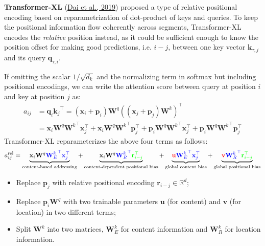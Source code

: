 \documentclass[12pt]{article}
\begin{document}
\textbf{Transformer-XL} (\href{https://arxiv.org/abs/1901.02860}{Dai et al., 2019}) proposed a type of relative positional encoding based on reparametrization of dot-product of keys and queries. To keep the positional information flow coherently across segments, Transformer-XL encodes the \emph{relative} position instead, as it could be sufficient enough to know the position offset for making good predictions, i.e. $i-j$, between one key vector $\mathbf{k}_{\tau, j}$ and its query $\mathbf{q}_{\tau, i}$.

If omitting the scalar $1/\sqrt{d_k}$ and the normalizing term in softmax but including positional encodings, we can write the attention score between query at position $i$ and key at position $j$ as:
\[
\begin{aligned}
a_{ij} 
&= \mathbf{q}_i {\mathbf{k}_j}^\top = (\mathbf{x}_i + \mathbf{p}_i)\mathbf{W}^q ((\mathbf{x}_j + \mathbf{p}_j)\mathbf{W}^k)^\top \\
&= \mathbf{x}_i\mathbf{W}^q {\mathbf{W}^k}^\top\mathbf{x}_j^\top + \mathbf{x}_i\mathbf{W}^q {\mathbf{W}^k}^\top\mathbf{p}_j^\top + \mathbf{p}_i\mathbf{W}^q {\mathbf{W}^k}^\top\mathbf{x}_j^\top + \mathbf{p}_i\mathbf{W}^q {\mathbf{W}^k}^\top\mathbf{p}_j^\top
\end{aligned}
\]
Transformer-XL reparameterizes the above four terms as follows:
\[
a_{ij}^\text{rel} = 
\underbrace{ \mathbf{x}_i\mathbf{W}^q \color{blue}{ {\mathbf{W}_E^k}^\top } \mathbf{x}_j^\top }_\text{content-based addressing} + 
\underbrace{ \mathbf{x}_i\mathbf{W}^q \color{blue}{ {\mathbf{W}_R^k}^\top } \color{green}{\mathbf{r}_{i-j}^\top} }_\text{content-dependent positional bias} + 
\underbrace{ \color{red}{\mathbf{u}} \color{blue}{ {\mathbf{W}_E^k}^\top } \mathbf{x}_j^\top }_\text{global content bias} + 
\underbrace{ \color{red}{\mathbf{v}} \color{blue}{ {\mathbf{W}_R^k}^\top } \color{green}{\mathbf{r}_{i-j}^\top} }_\text{global positional bias}
\]
\begin{itemize}
    \item Replace $\mathbf{p}_j$ with relative positional encoding $\mathbf{r}_{i-j} \in \mathbb{R}^{d}$;
    \item Replace $\mathbf{p}_i\mathbf{W}^q$ with two trainable parameters $\mathbf{u}$ (for content) and $\mathbf{v}$ (for location) in two different terms;
    \item Split $\mathbf{W}^k$ into two matrices, $\mathbf{W}^k_E$ for content information and $\mathbf{W}^k_R$ for location information.
\end{itemize}
\end{document}
